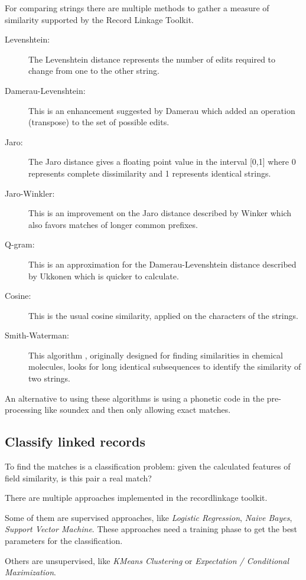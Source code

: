 \documentclass[sigconf,nonacm]{acmart}
\begin{document}
For comparing strings there are multiple methods to gather a measure
of similarity supported by the Record Linkage Toolkit.
\begin{description}
\item[Levenshtein:]
The Levenshtein distance \cite{Levenshtein}
represents the number of edits required to change
from one to the other string.
\item[Damerau-Levenshtein:]
This is an enhancement suggested by Damerau \cite{Damerau} which
added an operation (transpose) to the set of possible edits.
\item[Jaro:]
The Jaro distance \cite{Jaro} gives a floating point value
in the interval [0,1] where 0 represents complete dissimilarity and 1
represents identical strings.
\item[Jaro-Winkler:]
This is an improvement on the Jaro distance described by Winker \cite{Winkler}
which also favors matches of longer common prefixes.
\item[Q-gram:]
This is an approximation for the Damerau-Levenshtein distance
described by Ukkonen \cite{Ukkonen}
which is quicker to calculate.
\item[Cosine:]
This is the usual cosine similarity, applied on the characters of
the strings.
\item[Smith-Waterman:]
This algorithm \cite{Smith-Waterman}, originally designed for finding similarities in
chemical molecules, looks for long identical subsequences to identify the similarity
of two strings.
\end{description}

An alternative to using these algorithms is using a phonetic code in
the pre-processing like soundex and then only allowing exact matches.

\subsection{Classify linked records}

To find the matches is a classification problem: given the calculated features
of field similarity, is this pair a real match?

There are multiple approaches implemented in the recordlinkage toolkit.

Some of them are supervised approaches, like \emph{Logistic Regression},
\emph{Naive Bayes}, \emph{Support Vector Machine}.
These approaches need a training phase to get the best parameters for
the classification.

Others are unsupervised, like \emph{KMeans Clustering} or
\emph{Expectation / Conditional Maximization}.
\end{document}
